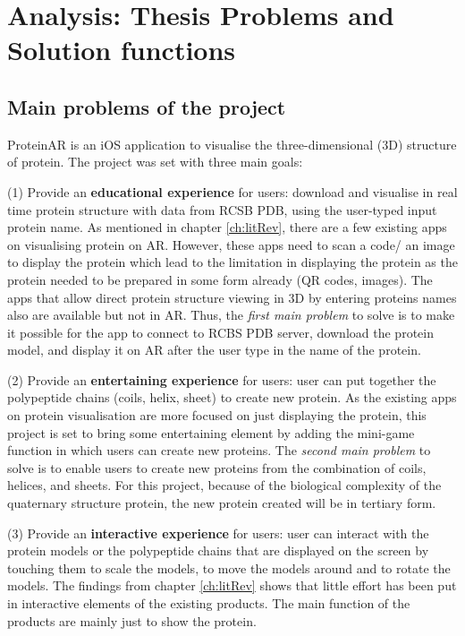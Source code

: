 \chapter{Analysis: Thesis Problems and Solution functions}
\label{ch:analysis2}

\section{Main problems of the project}
ProteinAR is an iOS application to visualise the three-dimensional (3D) structure of protein. The project was set with three main goals:

(1) Provide an \textbf{educational experience} for users: download and visualise in real time protein structure with data from RCSB PDB, using the user-typed input protein name. As mentioned in chapter \ref{ch:litRev}, there are a few existing apps on visualising protein on AR. However, these apps need to scan a code/ an image to display the protein which lead to the limitation in displaying the protein as the protein needed to be prepared in some form already (QR codes, images). The apps that allow direct protein structure viewing in 3D by entering proteins names also are available but not in AR. 
Thus, the \emph{first main problem} to solve is to make it possible for the app to connect to RCBS PDB server, download the protein model, and display it on AR after the user type in the name of the protein. 

(2) Provide an \textbf{entertaining experience} for users: user can put together the polypeptide chains (coils, helix, sheet) to create new protein. As the existing apps on protein visualisation are more focused on just displaying the protein, this project is set to bring some entertaining element by adding the mini-game function in which users can create new proteins. 
The \emph{second main problem} to solve is to enable users to create new proteins from the combination of coils, helices, and sheets. For this project, because of the biological complexity of the quaternary structure protein, the new protein created will be in tertiary form. 

(3) Provide an \textbf{interactive experience} for users: user can interact with the protein models or the polypeptide chains that are displayed on the screen by touching them to scale the models, to move the models around and to rotate the models. The findings from chapter \ref{ch:litRev} shows that little effort has been put in interactive elements of the existing products. The main function of the products are mainly just to show the protein. 

